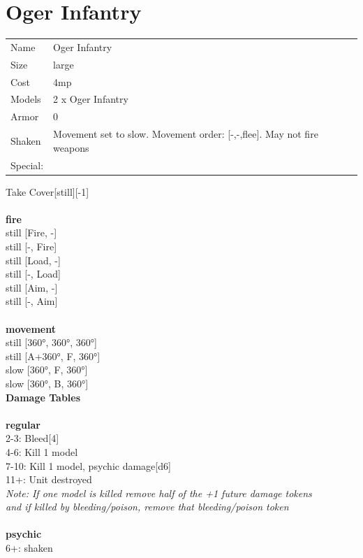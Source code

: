 \clearpage

\section{ Oger Infantry }

\begin{tabular}{ll}
  Name & Oger Infantry \\
  Size & large\\
  Cost & 4mp\\
  Models & 2 x Oger Infantry\\
  Armor & 0\\
  Shaken & Movement set to slow. Movement order: [-,-,flee]. May not fire weapons\\
  Special: \\
\end{tabular}

\noindent Take Cover[still][-1]\\ 


\ \\ {\bf fire } \\
still [Fire, -] \\
still [-, Fire] \\
still [Load, -] \\
still [-, Load] \\
still [Aim, -] \\
still [-, Aim] \\
\ \\ {\bf movement } \\
still [360°, 360°, 360°] \\
still [A+360°, F, 360°] \\
slow [360°, F, 360°] \\
slow [360°, B, 360°] \\


{\bf Damage Tables} \\
\ \\ {\bf regular } \\
2-3: Bleed[4] \\
4-6: Kill 1 model \\
7-10: Kill 1 model, psychic damage[d6] \\
11+: Unit destroyed \\
{{\it Note: If one model is killed remove half of the +1 future damage tokens \\ and if killed by bleeding/poison, remove that bleeding/poison token}} \\
\ \\ {\bf psychic } \\
6+: shaken \\


